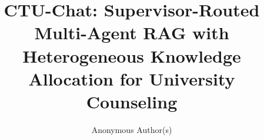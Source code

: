\documentclass[runningheads]{llncs}
\begin{document}
\title{CTU-Chat: Supervisor-Routed Multi-Agent RAG with Heterogeneous Knowledge Allocation for University Counseling}

\author{Anonymous Author(s)}

\maketitle










\end{document}
